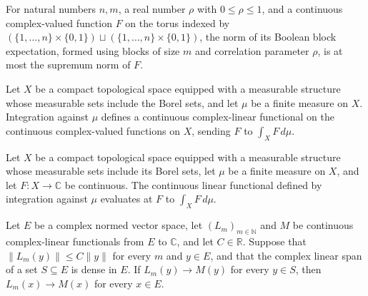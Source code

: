 \begin{lemma}
\label{BooleanAnalysis.GaussianSpace.norm_booleanBlockExpectation_le}
\leanok
{}
For natural numbers $n,m$, a real number $\rho$ with $0\le\rho\le1$, and a continuous
complex-valued function $F$ on the torus indexed by
$(\{1,\ldots,n\}\times\{0,1\})\sqcup(\{1,\ldots,n\}\times\{0,1\})$, the norm of its
Boolean block expectation, formed using blocks of size $m$ and correlation parameter
$\rho$, is at most the supremum norm of $F$.
\end{lemma}

\begin{definition}
\label{BooleanAnalysis.GaussianSpace.compactIntegralCLM}
\leanok
Let $X$ be a compact topological space equipped with a measurable structure whose
measurable sets include the Borel sets, and let $\mu$ be a finite measure on $X$.
Integration against $\mu$ defines a continuous complex-linear functional on the
continuous complex-valued functions on $X$, sending $F$ to $\int_X F\,d\mu$.
\end{definition}

\begin{lemma}
\label{BooleanAnalysis.GaussianSpace.compactIntegralCLM_apply}
\leanok
{}
Let $X$ be a compact topological space equipped with a measurable structure whose
measurable sets include its Borel sets, let $\mu$ be a finite measure on $X$, and let
$F:X\to\mathbb C$ be continuous. The continuous linear functional defined by integration
against $\mu$ evaluates at $F$ to $\int_X F\,d\mu$.
\end{lemma}

\begin{lemma}
\label{BooleanAnalysis.GaussianSpace.tendsto_clm_of_dense_span}
\leanok
{}
Let $E$ be a complex normed vector space, let $(L_m)_{m\in\mathbb N}$ and $M$ be
continuous complex-linear functionals from $E$ to $\mathbb C$, and let $C\in\mathbb R$.
Suppose that $\|L_m(y)\|\le C\|y\|$ for every $m$ and $y\in E$, and that the complex
linear span of a set $S\subseteq E$ is dense in $E$. If $L_m(y)\to M(y)$ for every $y\in
S$, then $L_m(x)\to M(x)$ for every $x\in E$.
\end{lemma}

